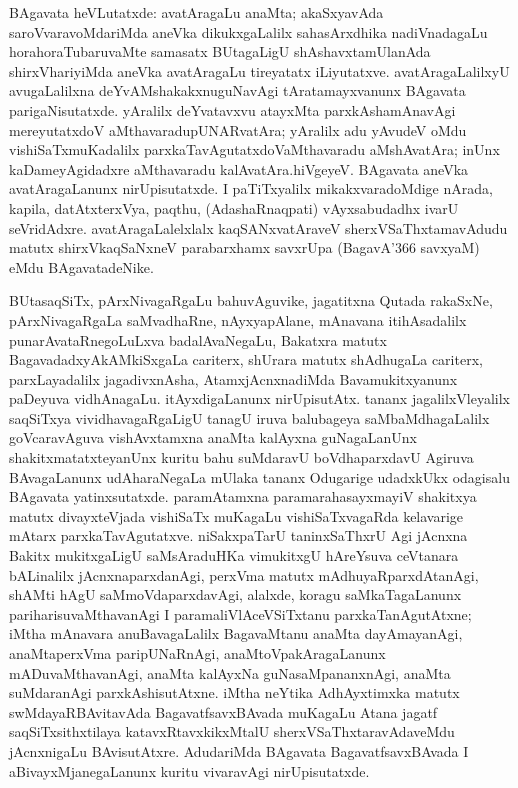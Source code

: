 BAgavata heVLutatxde: avatAragaLu anaMta; akaSxyavAda saroVvaravoMda\-riMda aneVka dikukxgaLalilx sahasArxdhika nadiVnadagaLu horahoraTubaruvaMte samasatx BUta\break\-gaLigU shAshavxtamUlanAda shirxVhariyiMda aneVka avatAragaLu tireyatatx iLiyutatxve. avatAragaLalilxyU avugaLalilxna deYvAMshakakxnuguNavAgi tAratamayxvanunx BAgavata parigaNisutatxde. yAralilx deYvatavxvu atayxMta parxkAshamAnavAgi mereyutatxdoV aMthavaradu\break pUNARvatAra; yAralilx adu yAvudeV oMdu vishiSaTxmuKadalilx parxkaTavAgu\-tatxdoV\break aMthavaradu aMshAvatAra; inUnx kaDameyAgidadxre aMthavaradu kalAvatAra.\break hiVgeyeV. BAgavata aneVka avatAragaLanunx nirUpisutatxde. I paTiTxyalilx mikakxvara\-doMdige nArada, kapila, datAtxterxVya, paqthu, (AdashaRnaqpati) vAyxsabudadhx ivarU seVridAdxre. avatAragaLalelxlalx kaqSANxvatAraveV sherxVSaThxtamavAdudu matutx shirxVkaqSaNxneV para\-barxhamx savxrUpa (BagavA\char'366 savxyaM) eMdu BAgavatadeNike. 

BUtasaqSiTx, pArxNivagaRgaLu bahuvAguvike, jagatitxna Qutada rakaSxNe, pArxNivagaR\-gaLa saMvadhaRne, nAyxyapAlane, mAnavana itihAsadalilx punarAvataRnegoLuLxva badalA\-vaNegaLu, Bakatxra matutx BagavadadxyAkAMkiSxgaLa cariterx, shUrara matutx shAdhugaLa cariterx, parxLayadalilx jagadivxnAsha, AtamxjAcnxnadiMda Bavamukitxyanunx paDeyuva vidhAnagaLu. itAyxdigaLanunx nirUpisutAtx. tananx jagalilxVleyalilx saqSiTxya vividhavagaRgaLigU tanagU iruva balubageya saMbaMdhagaLalilx goVcaravAguva vishAvxtamxna anaMta kalAyxna guNagaLanUnx shakitxmatatxteyanUnx kuritu bahu suMdaravU boVdhaparxdavU Agiruva BAvagaLanunx udAharaNegaLa mUlaka tananx Odugarige udadxkUkx odagisalu BAgavata yatinxsutatxde. paramAtamxna paramarahasayxmayiV shakitxya matutx divayxteVjada vishiSaTx muKagaLu vishiSaTxvagaRda kelavarige mAtarx parxkaTavAgutatxve. niSakxpaTarU taninxSaThxrU Agi jAcnxna Bakitx mukitxgaLigU saMsAraduHKa vimukitxgU hAreYsuva ceVtanara bALinalilx jAcnxnaparxdanAgi, perxVma matutx mAdhuyaRparxdAtanAgi, shAMti hAgU saMmoVdaparxdavAgi, alalxde, koragu saMkaTagaLanunx pariharisuvaMthavanAgi I paramaliVlAceVSiTxtanu parxkaTanAgutAtxne; iMtha mAnavara anuBavagaLalilx BagavaMtanu anaMta dayAmayanAgi, anaMtaperxVma paripUNaRnAgi, anaMtoVpakAragaLanunx mADuvaMthavanAgi, anaMta kalAyxNa guNasaMpananxnAgi, anaMta suMdaranAgi parxkAshisutAtxne. iMtha neYtika AdhAyxtimxka matutx swMdayaRBAvitavAda BagavatfsavxBAvada muKagaLu Atana jagatf saqSiTxsithxtilaya katavxRtavxkikxMtalU sherxVSaThxtaravAdaveMdu jAcnxnigaLu BAvisutAtxre. AdudariMda BAgavata BagavatfsavxBAvada I aBivayxMjanegaLanunx kuritu vivaravAgi nirUpisutatxde.

